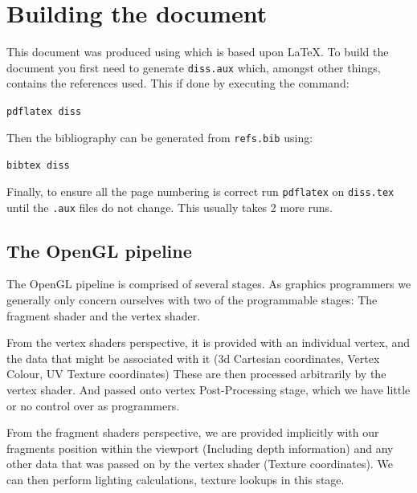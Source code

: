 \documentclass[12pt,a4paper,twoside,openright]{report}
\begin{document}
\section{Building the document}

This document was produced using \LaTeXe which is based upon
\LaTeX\cite{Lamport86}.  To build the document you first need to
generate \texttt{diss.aux} which, amongst other things, contains the
references used.  This if done by executing the command:

\texttt{pdflatex diss}

\noindent
Then the bibliography can be generated from \texttt{refs.bib} using:

\texttt{bibtex diss}

\noindent
Finally, to ensure all the page numbering is correct run \texttt{pdflatex}
on \texttt{diss.tex} until the \texttt{.aux} files do not change.  This
usually takes 2 more runs.

\subsection{The OpenGL pipeline}

The OpenGL pipeline is comprised of several stages. As graphics programmers we generally only concern ourselves with two of the programmable stages: The fragment shader and the vertex shader.

From the vertex shaders perspective, it is provided with an individual vertex, and the data that might be associated with it (3d Cartesian coordinates, Vertex Colour, UV Texture coordinates) These are then processed arbitrarily by the vertex shader. And passed onto vertex Post-Processing stage, which we have little or no control over as programmers.

From the fragment shaders perspective, we are provided implicitly with our fragments position within the viewport (Including depth information) and any other data that was passed on by the vertex shader (Texture coordinates). We can then perform lighting calculations, texture lookups in this stage.
\end{document}
